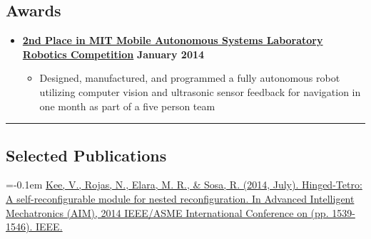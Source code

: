 \documentclass[10pt,letterpaper]{article}
\begin{document}
\subsection*{Awards}
  \begin{itemize}
    \parskip=-0.1em
    
    \item[]
    {\href{http://maslab.mit.edu/2014/site/index.html}{\textbf{2nd Place in MIT Mobile Autonomous Systems Laboratory Robotics Competition}} \hfill
      \textbf{January 2014}}

    \begin{itemize}[label=\textbullet]
      \itemsep0em
      \item Designed, manufactured, and programmed a fully autonomous robot utilizing computer vision and ultrasonic sensor feedback for navigation in one month as part of a five person team
      \end{itemize}    
\end{itemize}

\hrule
\vspace{-0.6em}

\subsection*{Selected Publications}
    \parskip=-0.1em
{\href{http://ieeexplore.ieee.org/xpls/abs_all.jsp?arnumber=6878302}{Kee, V., Rojas, N., Elara, M. R., \& Sosa, R. (2014, July). Hinged-Tetro: A self-reconfigurable module for nested reconfiguration. In Advanced Intelligent Mechatronics (AIM), 2014 IEEE/ASME International Conference on (pp. 1539-1546). IEEE.}}
\end{document}

